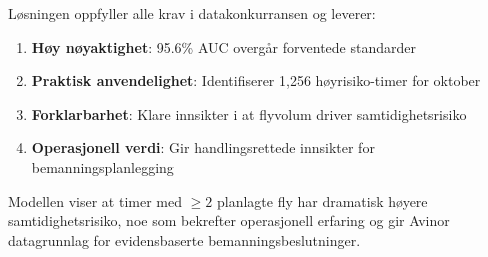 \documentclass[11pt,a4paper]{article}
\begin{document}
Løsningen oppfyller alle krav i datakonkurransen og leverer:

\begin{enumerate}
    \item \textbf{Høy nøyaktighet}: 95.6\% AUC overgår forventede standarder
    \item \textbf{Praktisk anvendelighet}: Identifiserer 1,256 høyrisiko-timer for oktober
    \item \textbf{Forklarbarhet}: Klare innsikter i at flyvolum driver samtidighetsrisiko
    \item \textbf{Operasjonell verdi}: Gir handlingsrettede innsikter for bemanningsplanlegging
\end{enumerate}

Modellen viser at timer med $\geq 2$ planlagte fly har dramatisk høyere samtidighetsrisiko, noe som bekrefter operasjonell erfaring og gir Avinor datagrunnlag for evidensbaserte bemanningsbeslutninger.
\end{document}
